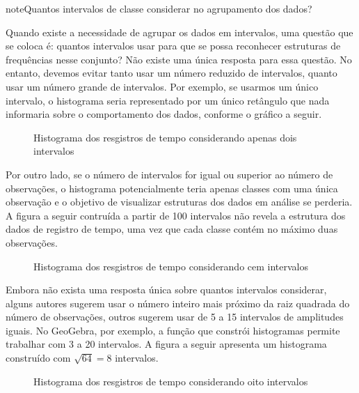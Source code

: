 \begin{sphinxadmonition}{note}{Quantos intervalos de classe considerar no agrupamento dos dados?}

Quando existe a necessidade de agrupar os dados em intervalos, uma questão que se coloca é: quantos intervalos usar para que se possa reconhecer estruturas de frequências nesse conjunto? Não existe uma única resposta para essa questão. No entanto, devemos evitar tanto usar um número reduzido de intervalos, quanto usar um número grande de intervalos. Por exemplo, se usarmos um único intervalo, o histograma seria representado por um único retângulo que nada informaria sobre o comportamento dos dados, conforme o gráfico a seguir.

\begin{figure}[H]
\centering
\capstart

\noindent{}
\caption{Histograma dos resgistros de tempo considerando apenas dois intervalos}\label{\detokenize{PE103-4:id4}}\end{figure}

Por outro lado, se o número de intervalos for igual ou superior ao número de observações, o histograma potencialmente teria apenas classes com uma única observação e o objetivo de visualizar estruturas dos dados em análise se perderia. A figura a seguir contruída a partir de 100 intervalos não revela a estrutura dos dados de registro de tempo, uma vez que cada classe contém no máximo duas observações.

\begin{figure}[H]
\centering
\capstart

\noindent{}
\caption{Histograma dos resgistros de tempo considerando cem intervalos}\label{\detokenize{PE103-4:id5}}\end{figure}

Embora não exista uma resposta única sobre quantos intervalos considerar, alguns autores sugerem usar o número inteiro mais próximo da raiz quadrada do número de observações, outros sugerem usar de 5 a 15 intervalos de amplitudes iguais. No GeoGebra, por exemplo, a função que constrói histogramas permite trabalhar com 3 a 20 intervalos. A figura a seguir apresenta um histograma construído com \(\sqrt{64}=8\) intervalos.

\begin{figure}[H]
\centering
\capstart

\noindent{}
\caption{Histograma dos resgistros de tempo considerando oito intervalos}\label{\detokenize{PE103-4:id6}}\end{figure}
\end{sphinxadmonition}

